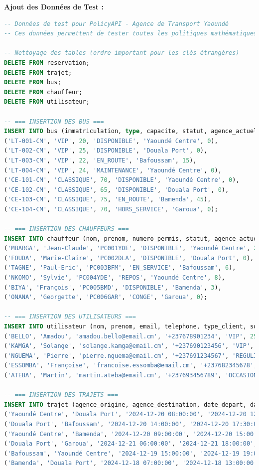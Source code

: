 \documentclass[12pt,a4paper]{article}
\begin{document}
    \begin{tcolorbox}[codebox]
        \textbf{Ajout des Données de Test :}
        \begin{lstlisting}[language=SQL]
-- Données de test pour PolicyAPI - Agence de Transport Yaoundé
-- Ces données permettent de tester toutes les politiques mathématiques

-- Nettoyage des tables (ordre important pour les clés étrangères)
DELETE FROM reservation;
DELETE FROM trajet;
DELETE FROM bus;
DELETE FROM chauffeur;
DELETE FROM utilisateur;

-- === INSERTION DES BUS ===
INSERT INTO bus (immatriculation, type, capacite, statut, agence_actuelle, passagers_actuels) VALUES
('LT-001-CM', 'VIP', 20, 'DISPONIBLE', 'Yaoundé Centre', 0),
('LT-002-CM', 'VIP', 25, 'DISPONIBLE', 'Douala Port', 0),
('LT-003-CM', 'VIP', 22, 'EN_ROUTE', 'Bafoussam', 15),
('LT-004-CM', 'VIP', 24, 'MAINTENANCE', 'Yaoundé Centre', 0),
('CE-101-CM', 'CLASSIQUE', 70, 'DISPONIBLE', 'Yaoundé Centre', 0),
('CE-102-CM', 'CLASSIQUE', 65, 'DISPONIBLE', 'Douala Port', 0),
('CE-103-CM', 'CLASSIQUE', 75, 'EN_ROUTE', 'Bamenda', 45),
('CE-104-CM', 'CLASSIQUE', 70, 'HORS_SERVICE', 'Garoua', 0);

-- === INSERTION DES CHAUFFEURS ===
INSERT INTO chauffeur (nom, prenom, numero_permis, statut, agence_actuelle, heures_travaillees) VALUES
('MBARGA', 'Jean-Claude', 'PC001YDE', 'DISPONIBLE', 'Yaoundé Centre', 2),
('FOUDA', 'Marie-Claire', 'PC002DLA', 'DISPONIBLE', 'Douala Port', 0),
('TAGNE', 'Paul-Eric', 'PC003BFM', 'EN_SERVICE', 'Bafoussam', 6),
('NKOMO', 'Sylvie', 'PC004YDE', 'REPOS', 'Yaoundé Centre', 8),
('BIYA', 'François', 'PC005BMD', 'DISPONIBLE', 'Bamenda', 3),
('ONANA', 'Georgette', 'PC006GAR', 'CONGE', 'Garoua', 0);

-- === INSERTION DES UTILISATEURS ===
INSERT INTO utilisateur (nom, prenom, email, telephone, type_client, solde_compte, nombre_voyages) VALUES
('BELLO', 'Amadou', 'amadou.bello@email.cm', '+237678901234', 'VIP', 250000.00, 25),
('KAMGA', 'Solange', 'solange.kamga@email.cm', '+237690123456', 'VIP', 180000.00, 18),
('NGUEMA', 'Pierre', 'pierre.nguema@email.cm', '+237691234567', 'REGULIER', 75000.00, 12),
('ESSOMBA', 'Françoise', 'francoise.essomba@email.cm', '+237682345678', 'REGULIER', 45000.00, 8),
('ATEBA', 'Martin', 'martin.ateba@email.cm', '+237693456789', 'OCCASIONNEL', 25000.00, 2);

-- === INSERTION DES TRAJETS ===
INSERT INTO trajet (agence_origine, agence_destination, date_depart, date_arrivee, bus_id, chauffeur_id, statut, prix, places_reservees) VALUES
('Yaoundé Centre', 'Douala Port', '2024-12-20 08:00:00', '2024-12-20 12:00:00', 1, 1, 'PLANIFIE', 15000.00, 8),
('Douala Port', 'Bafoussam', '2024-12-20 14:00:00', '2024-12-20 17:30:00', 2, 2, 'PLANIFIE', 18000.00, 5),
('Yaoundé Centre', 'Bamenda', '2024-12-20 09:00:00', '2024-12-20 15:00:00', 5, 5, 'PLANIFIE', 8000.00, 42),
('Douala Port', 'Garoua', '2024-12-21 06:00:00', '2024-12-21 18:00:00', 6, 2, 'PLANIFIE', 25000.00, 28),
('Bafoussam', 'Yaoundé Centre', '2024-12-19 15:00:00', '2024-12-19 19:00:00', 3, 3, 'EN_COURS', 18000.00, 15),
('Bamenda', 'Douala Port', '2024-12-18 07:00:00', '2024-12-18 13:00:00', 7, 5, 'TERMINE', 12000.00, 45);


\end{lstlisting}
\end{tcolorbox}
\end{document}
